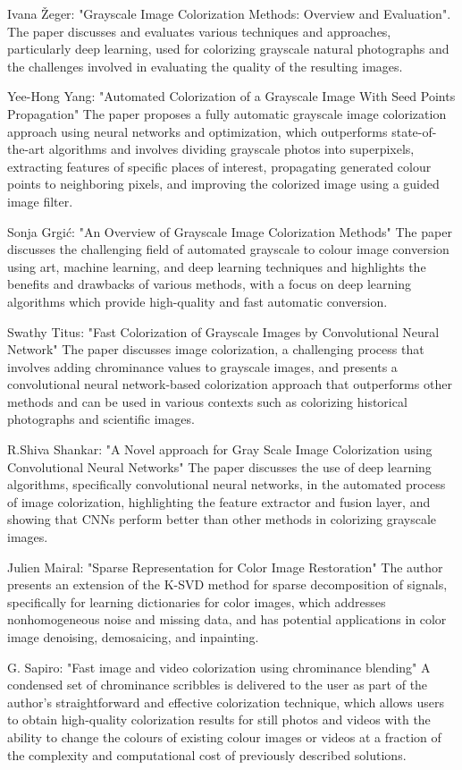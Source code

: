 \documentclass[conference]{IEEEtran}
\begin{document}
Ivana Žeger: "Grayscale Image Colorization Methods: Overview and Evaluation". The paper discusses and evaluates various techniques and approaches, particularly deep learning, used for colorizing grayscale natural photographs and the challenges involved in evaluating the quality of the resulting images. 

Yee-Hong Yang: "Automated Colorization of a Grayscale Image With Seed Points Propagation" The paper proposes a fully automatic grayscale image colorization approach using neural networks and optimization, which outperforms state-of-the-art algorithms and involves dividing grayscale photos into superpixels, extracting features of specific places of interest, propagating generated colour points to neighboring pixels, and improving the colorized image using a guided image filter.

Sonja Grgić: "An Overview of Grayscale Image Colorization Methods" The paper discusses the challenging field of automated grayscale to colour image conversion using art, machine learning, and deep learning techniques and highlights the benefits and drawbacks of various methods, with a focus on deep learning algorithms which provide high-quality and fast automatic conversion.

Swathy Titus: "Fast Colorization of Grayscale Images by Convolutional Neural Network" The paper discusses image colorization, a challenging process that involves adding chrominance values to grayscale images, and presents a convolutional neural network-based colorization approach that outperforms other methods and can be used in various contexts such as colorizing historical photographs and scientific images.

R.Shiva Shankar: "A Novel approach for Gray Scale Image Colorization using Convolutional Neural Networks" The paper discusses the use of deep learning algorithms, specifically convolutional neural networks, in the automated process of image colorization, highlighting the feature extractor and fusion layer, and showing that CNNs perform better than other methods in colorizing grayscale images.

Julien Mairal: "Sparse Representation for Color Image Restoration" The author presents an extension of the K-SVD method for sparse decomposition of signals, specifically for learning dictionaries for color images, which addresses nonhomogeneous noise and missing data, and has potential applications in color image denoising, demosaicing, and inpainting.

G. Sapiro: "Fast image and video colorization using chrominance blending" A condensed set of chrominance scribbles is delivered to the user as part of the author's straightforward and effective colorization technique, which allows users to obtain high-quality colorization results for still photos and videos with the ability to change the colours of existing colour images or videos at a fraction of the complexity and computational cost of previously described solutions.
\end{document}
